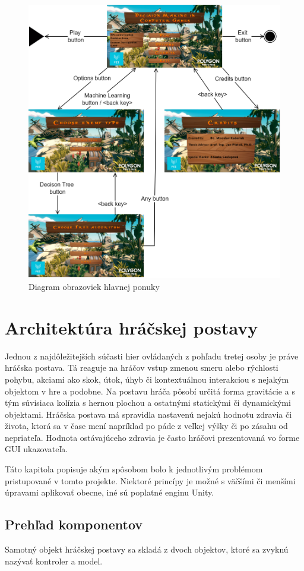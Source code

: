 \documentclass[slovak, master]{diploma}
\begin{document}
\begin{figure}[!htbp]
	\centering
	\includegraphics[width=.85\textwidth]{Figures/mainMenuScheme.png}
	\caption{Diagram obrazoviek hlavnej ponuky}
	\label{pic:MainMenuScheme}
\end{figure}

\chapter{Architektúra hráčskej postavy}
\label{sec:Player}
Jednou z najdôležitejších súčasti hier ovládaných z pohľadu tretej osoby je práve hráčska postava. Tá reaguje na hráčov vstup zmenou smeru alebo rýchlosti pohybu, akciami ako skok, útok, úhyb či kontextuálnou interakciou s nejakým objektom v hre a podobne. Na postavu hráča pôsobí určitá forma gravitácie a s tým súvisiaca kolízia s hernou plochou a ostatnými statickými či dynamickými objektami. Hráčska postava má spravidla nastavenú nejakú hodnotu zdravia či života, ktorá sa v čase mení napríklad po páde z veľkej výšky či po zásahu od nepriateľa. Hodnota ostávajúceho zdravia je často hráčovi prezentovaná vo forme GUI ukazovateľa. 

Táto kapitola popisuje akým spôsobom bolo k jednotlivým problémom pristupované v tomto projekte. Niektoré princípy je možné s väčšími či menšími úpravami aplikovať obecne, iné sú poplatné enginu Unity. 

\section{Prehľad komponentov}
\label{sec:PlayerComponentOverview} 
Samotný objekt hráčskej postavy sa skladá z dvoch objektov, ktoré sa zvyknú nazývať kontroler a model. 
\end{document}
